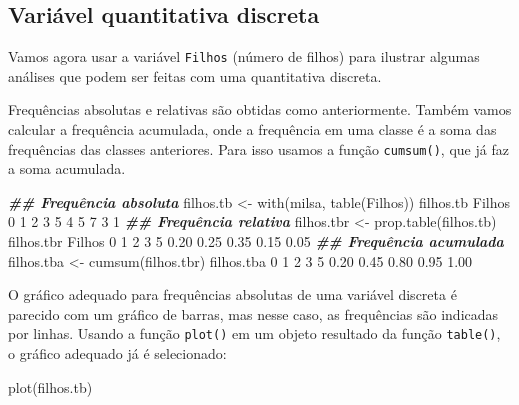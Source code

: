 \documentclass[
  10pt,
  a4paper]{book}
\newenvironment{Shaded}{\begin{snugshade}}{\end{snugshade}}
\newcommand{\DecValTok}[1]{\textcolor[rgb]{0.00,0.00,0.81}{#1}}
\newcommand{\DocumentationTok}[1]{\textcolor[rgb]{0.56,0.35,0.01}{\textbf{\textit{#1}}}}
\newcommand{\FloatTok}[1]{\textcolor[rgb]{0.00,0.00,0.81}{#1}}
\newcommand{\FunctionTok}[1]{\textcolor[rgb]{0.00,0.00,0.00}{#1}}
\newcommand{\NormalTok}[1]{#1}
\newcommand{\OtherTok}[1]{\textcolor[rgb]{0.56,0.35,0.01}{#1}}
\begin{document}
\hypertarget{variuxe1vel-quantitativa-discreta}{%
\subsection{Variável quantitativa discreta}\label{variuxe1vel-quantitativa-discreta}}

Vamos agora usar a variável \texttt{Filhos} (número de filhos) para
ilustrar algumas análises que podem ser feitas com uma quantitativa
discreta.

Frequências absolutas e relativas são obtidas como anteriormente. Também
vamos calcular a frequência acumulada, onde a frequência em uma classe é
a soma das frequências das classes anteriores. Para isso usamos a função
\texttt{cumsum()}, que já faz a soma acumulada.

\begin{Shaded}
\begin{Highlighting}[]
\DocumentationTok{\#\# Frequência absoluta}
\NormalTok{filhos.tb }\OtherTok{\textless{}{-}} \FunctionTok{with}\NormalTok{(milsa, }\FunctionTok{table}\NormalTok{(Filhos))}
\NormalTok{filhos.tb}
\NormalTok{Filhos}
\DecValTok{0} \DecValTok{1} \DecValTok{2} \DecValTok{3} \DecValTok{5} 
\DecValTok{4} \DecValTok{5} \DecValTok{7} \DecValTok{3} \DecValTok{1} 
\DocumentationTok{\#\# Frequência relativa}
\NormalTok{filhos.tbr }\OtherTok{\textless{}{-}} \FunctionTok{prop.table}\NormalTok{(filhos.tb)}
\NormalTok{filhos.tbr}
\NormalTok{Filhos}
   \DecValTok{0}    \DecValTok{1}    \DecValTok{2}    \DecValTok{3}    \DecValTok{5} 
\FloatTok{0.20} \FloatTok{0.25} \FloatTok{0.35} \FloatTok{0.15} \FloatTok{0.05} 
\DocumentationTok{\#\# Frequência acumulada}
\NormalTok{filhos.tba }\OtherTok{\textless{}{-}} \FunctionTok{cumsum}\NormalTok{(filhos.tbr)}
\NormalTok{filhos.tba}
   \DecValTok{0}    \DecValTok{1}    \DecValTok{2}    \DecValTok{3}    \DecValTok{5} 
\FloatTok{0.20} \FloatTok{0.45} \FloatTok{0.80} \FloatTok{0.95} \FloatTok{1.00} 
\end{Highlighting}
\end{Shaded}

O gráfico adequado para frequências absolutas de uma variável discreta é
parecido com um gráfico de barras, mas nesse caso, as frequências são
indicadas por linhas. Usando a função \texttt{plot()} em um objeto resultado da
função \texttt{table()}, o gráfico adequado já é selecionado:

\begin{Shaded}
\begin{Highlighting}[]
\FunctionTok{plot}\NormalTok{(filhos.tb)}
\end{Highlighting}
\end{Shaded}
\end{document}
